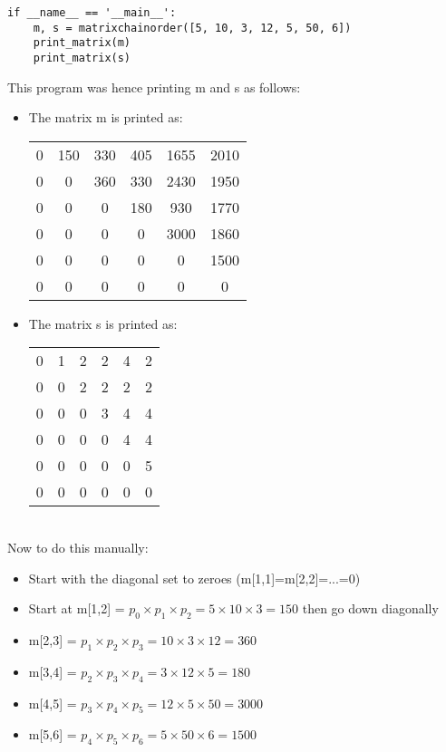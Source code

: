 \documentclass[11pt]{article}
\begin{document}
\begin{enumerate}
\begin{verbatim}
    


if __name__ == '__main__':
    m, s = matrixchainorder([5, 10, 3, 12, 5, 50, 6])
    print_matrix(m)
    print_matrix(s)
    \end{verbatim}
    This program was hence printing m and s as follows:
    \begin{itemize}
        \item The matrix m is printed as:
        \begin{tabular}{ c c c c c c }
        0 & 150 & 330 & 405 & 1655 & 2010 \\
        0 & 0 & 360 & 330 & 2430 & 1950 \\
        0 & 0 & 0 & 180 & 930 & 1770 \\
        0 & 0 & 0 & 0 & 3000 & 1860 \\
        0 & 0 & 0 & 0 & 0 & 1500 \\
        0 & 0 & 0 & 0 & 0 & 0 \\
        \end{tabular}
        \item The matrix s is printed as:
        \begin{tabular}{ c c c c c c }
        0 & 1 & 2 & 2 & 4 & 2 \\
        0 & 0 & 2 & 2 & 2 & 2 \\
        0 & 0 & 0 & 3 & 4 & 4 \\
        0 & 0 & 0 & 0 & 4 & 4 \\
        0 & 0 & 0 & 0 & 0 & 5 \\
        0 & 0 & 0 & 0 & 0 & 0 \\
        \end{tabular}
    \end{itemize}
    \\ Now to do this manually:
    \begin{itemize}
        \item Start with the diagonal set to zeroes (m[1,1]=m[2,2]=...=0)
        \item Start at m[1,2] = $p_0 \times p_1 \times p_2 = 5 \times 10 \times 3 = 150$ then go down diagonally
        \item m[2,3] = $p_1 \times p_2 \times p_3 = 10 \times 3 \times 12 = 360$
        \item m[3,4] = $p_2 \times p_3 \times p_4 = 3 \times 12 \times 5 = 180$
        \item m[4,5] = $p_3 \times p_4 \times p_5 = 12 \times 5 \times 50 = 3000$
        \item m[5,6] = $p_4 \times p_5 \times p_6 = 5 \times 50 \times 6 = 1500$

\end{itemize}
\end{enumerate}
\end{document}
